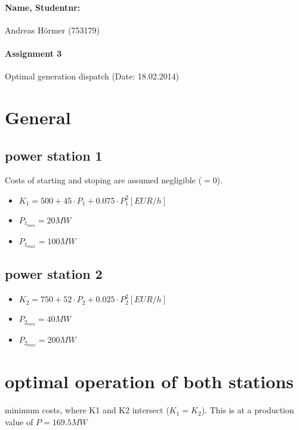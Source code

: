 \documentclass{article}
\begin{document}
	\paragraph{Name, Studentnr: }Andreas H\"ormer (753179)
	\paragraph{Assignment 3}Optimal generation dispatch (Date: 18.02.2014)
	\section{General}
		\subsection{power station 1}
			Costs of starting and stoping are assumed negligible ($=0$).
			\begin{itemize}
				\item $K_1=500+45\cdot P_1+0.075\cdot P_1^2 [EUR/h]$
				\item $P_{1_{min}}=20MW$
				\item $P_{1_{max}}=100MW$
			\end{itemize}
		\subsection{power station 2}
			\begin{itemize}
				\item $K_2=750+52\cdot P_2+0.025\cdot P_2^2 [EUR/h]$
				\item $P_{2_{min}}=40MW$
				\item $P_{2_{max}}=200MW$
			\end{itemize}
	\section{optimal operation of both stations}
		minimum costs, where K1 and K2 intersect ($K_1=K_2$). This is at a production value of $P=169.5MW$
\end{document}
